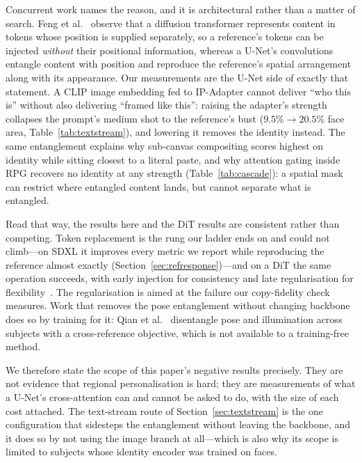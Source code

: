 \documentclass[review,10pt,times]{elsarticle}
\begin{document}
Concurrent work names the reason, and it is architectural rather than a matter
of search.  Feng et al.~\cite{feng2026personalize} observe that a diffusion
transformer represents content in tokens whose position is supplied separately,
so a reference's tokens can be injected \emph{without} their positional
information, whereas a U-Net's convolutions entangle content with position and
reproduce the reference's spatial arrangement along with its appearance.  Our
measurements are the U-Net side of exactly that statement.  A CLIP image
embedding fed to IP-Adapter cannot deliver ``who this is'' without also
delivering ``framed like this'': raising the adapter's strength collapses the
prompt's medium shot to the reference's bust ($9.5\% \to 20.5\%$ face area,
Table~\ref{tab:textstream}), and lowering it removes the identity instead.  The
same entanglement explains why sub-canvas compositing scores highest on
identity while sitting closest to a literal paste, and why attention gating
inside RPG recovers no identity at any strength (Table~\ref{tab:cascade}): a
spatial mask can restrict where entangled content lands, but cannot separate
what is entangled.

Read that way, the results here and the DiT results are consistent rather than
competing.  Token replacement is the rung our ladder ends on and could not
climb---on SDXL it improves every metric we report while reproducing the
reference almost exactly (Section~\ref{sec:refresponse})---and on a DiT the
same operation succeeds, with early injection for consistency and late
regularisation for flexibility~\cite{feng2026personalize}.  The regularisation
is aimed at the failure our copy-fidelity check measures.  Work that removes
the pose entanglement without changing backbone does so by training for it:
Qian et al.~\cite{qian2025canvascomposer} disentangle pose and illumination
across subjects with a cross-reference objective, which is not available to a
training-free method.

We therefore state the scope of this paper's negative results precisely.  They
are not evidence that regional personalisation is hard; they are measurements
of what a U-Net's cross-attention can and cannot be asked to do, with the size
of each cost attached.  The text-stream route of
Section~\ref{sec:textstream} is the one configuration that sidesteps the
entanglement without leaving the backbone, and it does so by not using the
image branch at all---which is also why its scope is limited to subjects whose
identity encoder was trained on faces.
\end{document}
